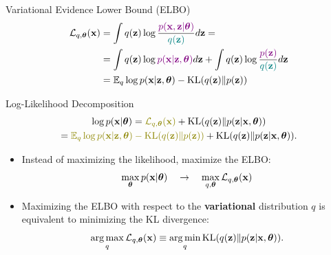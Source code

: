 \documentclass{beamer}
\begin{document}
\begin{frame}{Variational Evidence Lower Bound (ELBO)}
	\vspace{-0.3cm}
	\begin{align*}
		\mathcal{L}_{q, \boldsymbol{\theta}}(\mathbf{x}) &= \int q(\mathbf{z}) \log \frac{\color{violet}p(\mathbf{x}, \mathbf{z} | \boldsymbol{\theta})}{\color{teal}q(\mathbf{z})}d\mathbf{z} = \\ 
		&= \int q(\mathbf{z}) \log {\color{violet}p(\mathbf{x}| \mathbf{z}, \boldsymbol{\theta})} d\mathbf{z} + \int q(\mathbf{z}) \log \frac{\color{violet}p(\mathbf{z})}{\color{teal}q(\mathbf{z})}d\mathbf{z} \\ 
		&= \mathbb{E}_{q} \log p(\mathbf{x} | \mathbf{z}, \boldsymbol{\theta}) - \mathrm{KL} (q(\mathbf{z}) \| p(\mathbf{z}))
	\end{align*}
	\vspace{-0.5cm}
	\begin{block}{Log-Likelihood Decomposition}
		\vspace{-0.8cm}
		\begin{multline*}
			\log p(\bx| \btheta) = {\color{olive}\cL_{q, \btheta}(\bx)} + \KL(q(\bz) \| p(\bz|\bx, \btheta)) \\ = {\color{olive}\bbE_{q} \log p(\bx | \bz, \btheta) - \KL (q(\bz) \| p(\bz))} + \KL(q(\bz) \| p(\bz|\bx, \btheta)).
		\end{multline*}
		\vspace{-0.7cm}
	\end{block}
	\begin{itemize}
		\item Instead of maximizing the likelihood, maximize the ELBO:
		\[
		\max_{\boldsymbol{\theta}} p(\mathbf{x} | \boldsymbol{\theta}) \quad \rightarrow \quad \max_{q, \boldsymbol{\theta}} \mathcal{L}_{q, \boldsymbol{\theta}}(\mathbf{x})
		\]
		\item Maximizing the ELBO with respect to the \textbf{variational} distribution $q$ is equivalent to minimizing the KL divergence:
		\[
		\operatorname*{arg\,max}_q \mathcal{L}_{q, \boldsymbol{\theta}}(\mathbf{x}) \equiv \operatorname*{arg\,min}_q \mathrm{KL}(q(\mathbf{z}) \| p(\mathbf{z}|\mathbf{x}, \boldsymbol{\theta})).
		\]
	\end{itemize}
\end{frame}
\end{document}

